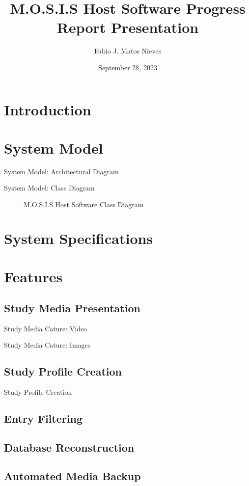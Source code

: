 \documentclass[17pt, aspectratio=169]{beamer}
\title[Host Software Progress Report]{M.O.S.I.S Host Software Progress Report Presentation}
\author[Fabio J. Matos Nieves]{Fabio J. Matos Nieves}
\institute[UPRM]{University of Puerto Rico Mayagüez Campus}
\date{September 28, 2023}
\begin{document}
\begin{frame}
	\maketitle
\end{frame}
\begin{frame}
	\tableofcontents
\end{frame}
\section{Introduction}
\section{System Model}
\begin{frame}{System Model: Architectural Diagram}

\end{frame}
\begin{frame}{System Model: Class Diagram}
	\begin{figure}
		\begin{small}
		\end{small}
		\caption{M.O.S.I.S Host Software Class Diagram}
	\end{figure}
\end{frame}
\section{System Specifications}
\section{Features}
\subsection{Study Media Presentation}
\begin{frame}{Study Media Cature: Video}

\end{frame}
\begin{frame}{Study Media Cature: Images}

\end{frame}
\subsection{Study Profile Creation}
\begin{frame}{Study Profile Creation}
\end{frame}
\subsection{Entry Filtering}
\subsection{Database Reconstruction}
\subsection{Automated Media Backup}
\end{document}
